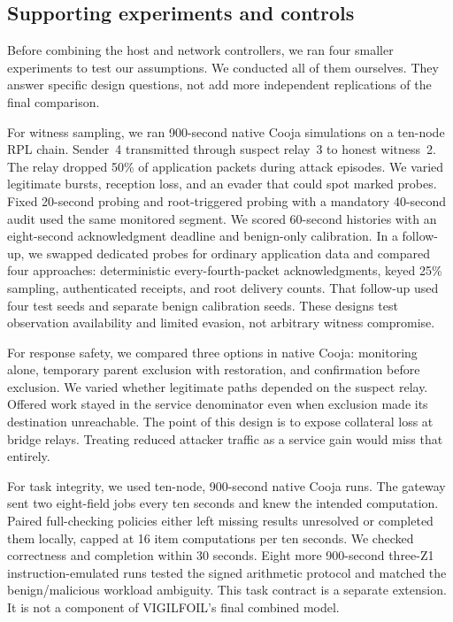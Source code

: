\documentclass[journal]{IEEEtran}
\begin{document}
\subsection{Supporting experiments and controls}\label{sec:support}
Before combining the host and network controllers, we ran four smaller experiments to test our assumptions. We conducted all of them ourselves. They answer specific design questions, not add more independent replications of the final comparison.

For witness sampling, we ran 900-second native Cooja simulations on a ten-node RPL chain. Sender~4 transmitted through suspect relay~3 to honest witness~2. The relay dropped 50\% of application packets during attack episodes. We varied legitimate bursts, reception loss, and an evader that could spot marked probes. Fixed 20-second probing and root-triggered probing with a mandatory 40-second audit used the same monitored segment. We scored 60-second histories with an eight-second acknowledgment deadline and benign-only calibration. In a follow-up, we swapped dedicated probes for ordinary application data and compared four approaches: deterministic every-fourth-packet acknowledgments, keyed 25\% sampling, authenticated receipts, and root delivery counts. That follow-up used four test seeds and separate benign calibration seeds. These designs test observation availability and limited evasion, not arbitrary witness compromise.

For response safety, we compared three options in native Cooja: monitoring alone, temporary parent exclusion with restoration, and confirmation before exclusion. We varied whether legitimate paths depended on the suspect relay. Offered work stayed in the service denominator even when exclusion made its destination unreachable. The point of this design is to expose collateral loss at bridge relays. Treating reduced attacker traffic as a service gain would miss that entirely.

For task integrity, we used ten-node, 900-second native Cooja runs. The gateway sent two eight-field jobs every ten seconds and knew the intended computation. Paired full-checking policies either left missing results unresolved or completed them locally, capped at 16 item computations per ten seconds. We checked correctness and completion within 30 seconds. Eight more 900-second three-Z1 instruction-emulated runs tested the signed arithmetic protocol and matched the benign/malicious workload ambiguity. This task contract is a separate extension. It is not a component of VIGILFOIL's final combined model.
\end{document}
